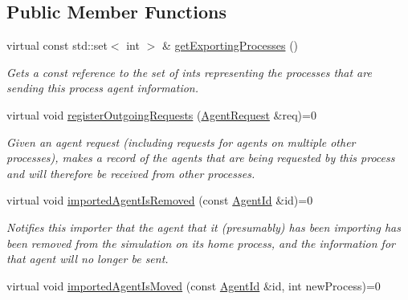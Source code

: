 \subsection*{Public Member Functions}
\begin{DoxyCompactItemize}
\item 
\hypertarget{classrepast_1_1_abstract_importer_ac32aaff9cd5bc7d300921bdc077b617c}{virtual const std\-::set$<$ int $>$ \& \hyperlink{classrepast_1_1_abstract_importer_ac32aaff9cd5bc7d300921bdc077b617c}{get\-Exporting\-Processes} ()}\label{classrepast_1_1_abstract_importer_ac32aaff9cd5bc7d300921bdc077b617c}

\begin{DoxyCompactList}\small\item\em Gets a const reference to the set of ints representing the processes that are sending this process agent information. \end{DoxyCompactList}\item 
virtual void \hyperlink{classrepast_1_1_abstract_importer_a1353cfde773ce5b3e7011571aff1f823}{register\-Outgoing\-Requests} (\hyperlink{classrepast_1_1_agent_request}{Agent\-Request} \&req)=0
\begin{DoxyCompactList}\small\item\em Given an agent request (including requests for agents on multiple other processes), makes a record of the agents that are being requested by this process and will therefore be received from other processes. \end{DoxyCompactList}\item 
\hypertarget{classrepast_1_1_abstract_importer_a7fc3bf6bb7ee568fb93f03c296c3ea0e}{virtual void \hyperlink{classrepast_1_1_abstract_importer_a7fc3bf6bb7ee568fb93f03c296c3ea0e}{imported\-Agent\-Is\-Removed} (const \hyperlink{classrepast_1_1_agent_id}{Agent\-Id} \&id)=0}\label{classrepast_1_1_abstract_importer_a7fc3bf6bb7ee568fb93f03c296c3ea0e}

\begin{DoxyCompactList}\small\item\em Notifies this importer that the agent that it (presumably) has been importing has been removed from the simulation on its home process, and the information for that agent will no longer be sent. \end{DoxyCompactList}\item 
\hypertarget{classrepast_1_1_abstract_importer_aba04688b4375bcc80278c4ec7ffdceb1}{virtual void \hyperlink{classrepast_1_1_abstract_importer_aba04688b4375bcc80278c4ec7ffdceb1}{imported\-Agent\-Is\-Moved} (const \hyperlink{classrepast_1_1_agent_id}{Agent\-Id} \&id, int new\-Process)=0}\label{classrepast_1_1_abstract_importer_aba04688b4375bcc80278c4ec7ffdceb1}


\end{DoxyCompactItemize}
